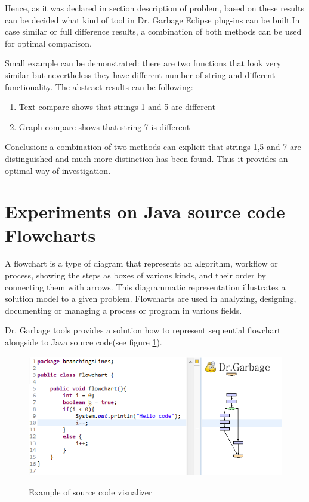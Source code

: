 \documentclass{report}
\begin{document}
Hence, as it was declared in section description of problem, based on these results can be decided what kind of tool in Dr. Garbage Eclipse plug-ins can be built.In case similar or full difference results, a combination of both methods can be used for optimal comparison. 

Small example can be demonstrated: there are two functions that look very similar but nevertheless they have different number of string and different functionality. The abstract results can be following:
\begin{enumerate}
	\item Text compare shows that strings 1 and 5 are different
	\item Graph compare shows that string 7 is different 
\end{enumerate}

Conclusion: a combination of two methods can explicit that strings 1,5 and 7 are distinguished and much more distinction has been found. Thus it provides an optimal way of investigation.



\section{Experiments on Java source code Flowcharts}

A flowchart is a type of diagram that represents an algorithm, workflow or process, showing the steps as boxes of various kinds, and their order by connecting them with arrows. This diagrammatic representation illustrates a solution model to a given problem. Flowcharts are used in analyzing, designing, documenting or managing a process or program in various fields\cite{wiki_flowchart}.

Dr. Garbage tools\cite{drgarbage} provides a solution how to represent sequential flowchart alongside to Java source code(see figure \ref{fig:java-flowchart-example}).
\begin{figure}[h]
  \centering
  \includegraphics[width=1.00\textwidth]{Figures/Java-flowchart-exp/java-flowchart-example.png}\\[0.1cm]
  \caption[Java sequential block diagram opened in Java Source code Visualizer]{Example of source code visualizer}
  \label{fig:java-flowchart-example}
\end{figure}
\end{document}
